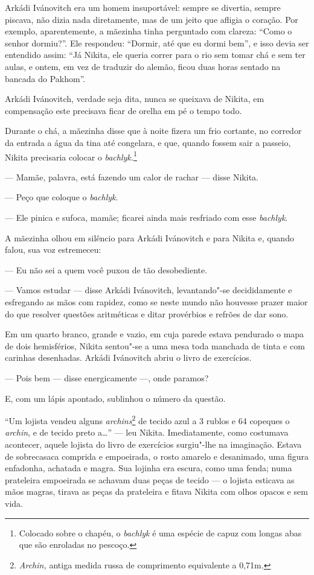 Arkádi Ivánovitch era um homem insuportável: sempre se divertia, sempre
piscava, não dizia nada diretamente, mas de um jeito que afligia o
coração. Por exemplo, aparentemente, a mãezinha tinha perguntado com
clareza: ``Como o senhor dormiu?''. Ele respondeu: ``Dormir, até que eu
dormi bem'', e isso devia ser entendido assim: ``Já Nikita, ele queria
correr para o rio sem tomar chá e sem ter aulas, e ontem, em vez de
traduzir do alemão, ficou duas horas sentado na bancada do Pakhom''.

Arkádi Ivánovitch, verdade seja dita, nunca se queixava de Nikita, em
compensação este precisava ficar de orelha em pé o tempo todo.

Durante o chá, a mãezinha disse que à noite fizera um frio cortante,
no corredor da entrada a água da tina até congelara, e que, quando
fossem sair a passeio, Nikita precisaria colocar o
\emph{bachlyk.}\footnote{Colocado sobre o chapéu, o \emph{bachlyk} é uma
  espécie de capuz com longas abas que são enroladas no pescoço.}

--- Mamãe, palavra, está fazendo um calor de rachar --- disse Nikita.

--- Peço que coloque o \emph{bachlyk}.

--- Ele pinica e sufoca, mamãe; ficarei ainda mais resfriado com esse
\emph{bachlyk}.

A mãezinha olhou em silêncio para Arkádi Ivánovitch e para Nikita e,
quando falou, sua voz estremeceu:

--- Eu não sei a quem você puxou de tão desobediente.

--- Vamos estudar --- disse Arkádi Ivánovitch, levantando"-se
decididamente e esfregando as mãos com rapidez, como se neste mundo não
houvesse prazer maior do que resolver questões aritméticas e ditar
provérbios e refrões de dar sono.

Em um quarto branco, grande e vazio, em cuja parede estava pendurado o
mapa de dois hemisférios, Nikita sentou"-se a uma mesa toda manchada de
tinta e com carinhas desenhadas. Arkádi Ivánovitch abriu o livro de
exercícios.

--- Pois bem --- disse energicamente ---, onde paramos?

E, com um lápis apontado, sublinhou o número da questão.

``Um lojista vendeu alguns \emph{archins}\footnote{\emph{Archin,} antiga
  medida russa de comprimento equivalente a 0,71m.} de tecido azul a 3
rublos e 64 copeques o \emph{archin}, e de tecido preto a\ldots{}'' --- leu
Nikita. Imediatamente, como costumava acontecer, aquele lojista do livro
de exercícios surgiu"-lhe na imaginação. Estava de sobrecasaca comprida e
empoeirada, o rosto amarelo e desanimado, uma figura enfadonha, achatada e
magra. Sua lojinha era escura, como uma fenda; numa prateleira
empoeirada se achavam duas peças de tecido --- o lojista esticava as mãos
magras, tirava as peças da prateleira e fitava Nikita com olhos opacos e
sem vida.

